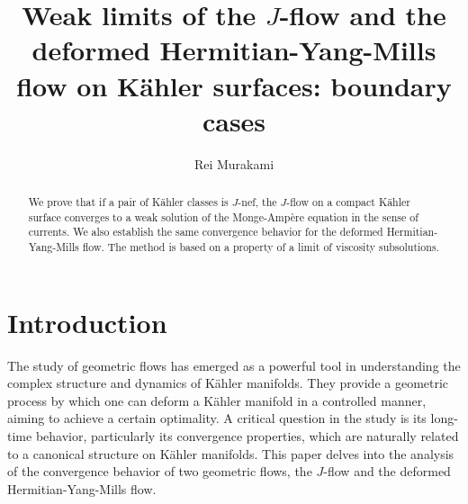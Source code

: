 \documentclass{amsart}
\author[R.\ Murakami]{Rei Murakami}
\numberwithin{equation}{section}
\theoremstyle{plain}
\theoremstyle{definition}
\theoremstyle{remark}
\begin{document}
\title[Weak limits of the $J$-flow and the dHYM flow]{Weak limits of the $J$-flow and the deformed Hermitian-Yang-Mills flow on K{\"a}hler surfaces: boundary cases}

\begin{abstract}
    We prove that if a pair of K{\"a}hler classes is $J$-nef, the $J$-flow on a compact K{\"a}hler surface converges to a weak solution of the Monge-Amp{\`e}re equation in the sense of currents. We also establish the same convergence behavior for the deformed Hermitian-Yang-Mills flow. The method is based on a property of a limit of viscosity subsolutions.
    
\end{abstract}



\maketitle



\section{Introduction}

The study of geometric flows has emerged as a powerful tool in understanding the complex structure and dynamics of K{\"a}hler manifolds. They provide a geometric process by which one can deform a K{\"a}hler manifold in a controlled manner, aiming to achieve a certain optimality. A critical question in the study is its long-time behavior, particularly its convergence properties, which are naturally related to a canonical structure on K{\"a}hler manifolds.
This paper delves into the analysis of the convergence behavior of two geometric flows, the $J$-flow and the deformed Hermitian-Yang-Mills flow. 
\end{document}
